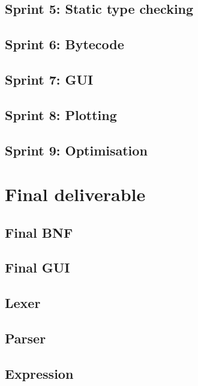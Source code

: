 \documentclass[a4paper, oneside, 11pt]{report}
\begin{document}
\section{Sprint 5: Static type checking}\label{sec:static-type-checking}

\section{Sprint 6: Bytecode}\label{sec:bytecode}

\section{Sprint 7: GUI}\label{sec:gui}

\section{Sprint 8: Plotting}\label{sec:plotting1}

\section{Sprint 9: Optimisation}\label{sec:optimisation1}

\chapter{Final deliverable}\label{ch:impl}

\section{Final BNF}\label{sec:final-bnf}

\section{Final GUI}\label{sec:final-gui}

\section{Lexer}\label{sec:lexer}

\section{Parser}\label{sec:parser}

\section{Expression}\label{sec:expression}
\end{document}
